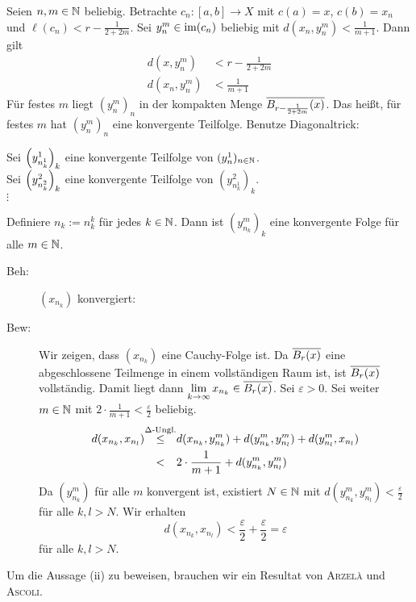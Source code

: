 \begin{beweis}[zu (i)]
		Seien $n,m \in \NN$ beliebig.
		Betrachte $c_n\colon [a,b] \rightarrow X$ mit $c(a) = x$, $c(b) = x_n$ und $\ell(c_n) < r - \frac{1}{2+2m}$. Sei $y_n^m \in \im(c_n)$ beliebig mit $d(x_n,y_n^m) < \frac{1}{m+1}$. Dann gilt
		\begin{align*}
			d(x,y_n^m) &< r - \frac{1}{2+2m} \\
			d(x_n,y_n^m) &< \frac{1}{m+1}
		\end{align*}
		Für festes $m$ liegt $(y_n^m)_n$ in der kompakten Menge $\ol{B_{r-\frac{1}{2+2m}}(x)}$.
		Das heißt, für festes $m$ hat $(y_n^m)_n$ eine konvergente Teilfolge. Benutze Diagonaltrick:
		\begin{center}
			Sei $\enbrace*{y_{n^1_k}^1}_k$ eine konvergente Teilfolge von $(y_n^1)_{n \in \NN}$. \\
			Sei $\enbrace*{y_{n^2_k}^2}_k$ eine konvergente Teilfolge von $(y_{n^1_k}^2)_k$. \\
			$\vdots$
		\end{center}
		Definiere $n_k := n_k^k$ für jedes $k \in \NN$.
		Dann ist $(y_{n_k}^m)_k$ eine konvergente Folge für alle $m \in \NN$.
		\begin{description}
			\item[Beh:]  $(x_{n_k})$ konvergiert:
			\item[Bew:] Wir zeigen, dass $(x_{n_k})$ eine Cauchy-Folge ist.
			Da $\ol{B_r(x)}$ eine abgeschlossene Teilmenge in einem vollständigen Raum ist, ist $\ol{B_r(x)}$ vollständig.
			Damit liegt dann $\lim\limits_{k \rightarrow \infty} x_{n_k} \in \ol{B_r(x)}$.
			Sei $\varepsilon > 0$.
			Sei weiter $m \in \NN$ mit $2 \cdot \frac{1}{m+1} < \frac{\varepsilon}{2}$ beliebig.
			\begin{align*}
				d(x_{n_k},x_{n_l}) &\stack{\Delta\text{-Ungl.}}{\leq} d(x_{n_k},y_{n_k}^m) + d(y_{n_k}^m,y_{n_l}^m) + d(y_{n_l}^m,x_{n_l}) \\
				&\stack{}{<} 2 \cdot \frac{1}{m+1} + d(y_{n_k}^m, y_{n_l}^m)
			\end{align*}
			Da $(y_{n_k}^m)$ für alle $m$ konvergent ist, existiert $N \in \NN$ mit $d(y_{n_k}^m,y_{n_l}^m) < \frac{\varepsilon}{2}$ für alle $k,l > N$. Wir erhalten
			\[
				d(x_{n_k},x_{n_l}) < \frac{\varepsilon}{2} + \frac{\varepsilon}{2} = \varepsilon
			\]
			für alle $k,l > N$. \qedhere
		\end{description}
\end{beweis}

Um die Aussage (ii) zu beweisen, brauchen wir ein Resultat von \textsc{Arzelà} und \textsc{Ascoli}. 

